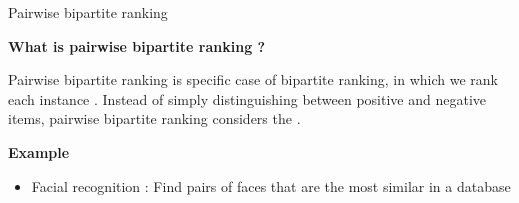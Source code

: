 \begin{frame}{Pairwise bipartite ranking}

    {\large\textbf{What is pairwise bipartite ranking ?}}

    Pairwise bipartite ranking is specific case of bipartite ranking, in which we rank each instance .  Instead of simply distinguishing between positive and negative items, pairwise bipartite ranking considers the . 

    \vspace{0.3cm}

    {\large\textbf{Example}}
    
    \begin{itemize}
        \item Facial recognition : Find pairs of faces that are the most similar in a database
    \end{itemize}

    
\end{frame}


